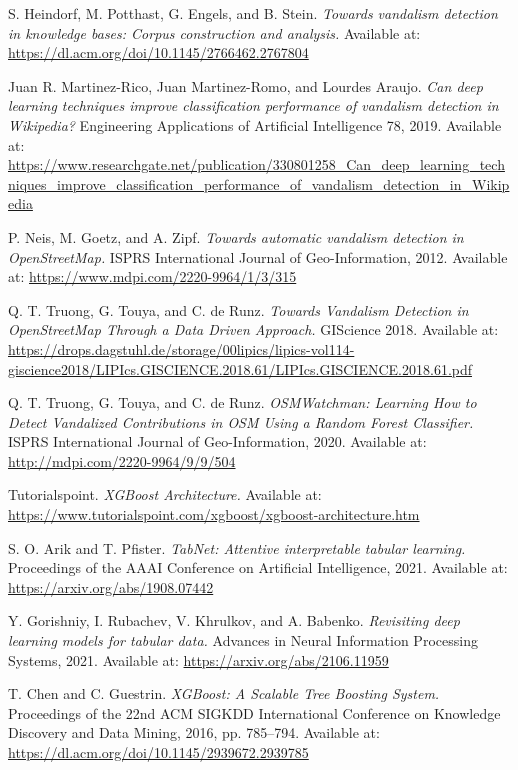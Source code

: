 \documentclass[
    13pt, %
    a4paper, %
    listof=totoc, %
    bibliography=totoc, %
    index=totoc, %
    headsepline
]{scrreprt}
\begin{document}
\begin{thebibliography}{9}
S. Heindorf, M. Potthast, G. Engels, and B. Stein.
\textit{Towards vandalism detection in knowledge bases: Corpus construction and analysis.}
Available at: \url{https://dl.acm.org/doi/10.1145/2766462.2767804}

Juan R. Martinez-Rico, Juan Martinez-Romo, and Lourdes Araujo.
\textit{Can deep learning techniques improve classification performance of vandalism detection in Wikipedia?}
Engineering Applications of Artificial Intelligence 78, 2019.
Available at: \url{https://www.researchgate.net/publication/330801258_Can_deep_learning_techniques_improve_classification_performance_of_vandalism_detection_in_Wikipedia}

P. Neis, M. Goetz, and A. Zipf.
\textit{Towards automatic vandalism detection in OpenStreetMap.}
ISPRS International Journal of Geo-Information, 2012.
Available at: \url{https://www.mdpi.com/2220-9964/1/3/315}

Q. T. Truong, G. Touya, and C. de Runz.
\textit{Towards Vandalism Detection in OpenStreetMap Through a Data Driven Approach.}
GIScience 2018.
Available at: \url{https://drops.dagstuhl.de/storage/00lipics/lipics-vol114-giscience2018/LIPIcs.GISCIENCE.2018.61/LIPIcs.GISCIENCE.2018.61.pdf}

Q. T. Truong, G. Touya, and C. de Runz.
\textit{OSMWatchman: Learning How to Detect Vandalized Contributions in OSM Using a Random Forest Classifier.}
ISPRS International Journal of Geo-Information, 2020.
Available at: \url{http://mdpi.com/2220-9964/9/9/504}

Tutorialspoint.
\textit{XGBoost Architecture.}
Available at: \url{https://www.tutorialspoint.com/xgboost/xgboost-architecture.htm}

S. O. Arik and T. Pfister.
\textit{TabNet: Attentive interpretable tabular learning.}
Proceedings of the AAAI Conference on Artificial Intelligence, 2021.
Available at: \url{https://arxiv.org/abs/1908.07442}

Y. Gorishniy, I. Rubachev, V. Khrulkov, and A. Babenko.
\textit{Revisiting deep learning models for tabular data.}
Advances in Neural Information Processing Systems, 2021.
Available at: \url{https://arxiv.org/abs/2106.11959}

T. Chen and C. Guestrin.
\textit{XGBoost: A Scalable Tree Boosting System.}
Proceedings of the 22nd ACM SIGKDD International Conference on Knowledge Discovery and Data Mining, 2016, pp. 785–794.
Available at: \url{https://dl.acm.org/doi/10.1145/2939672.2939785}


\end{thebibliography}
\end{document}
